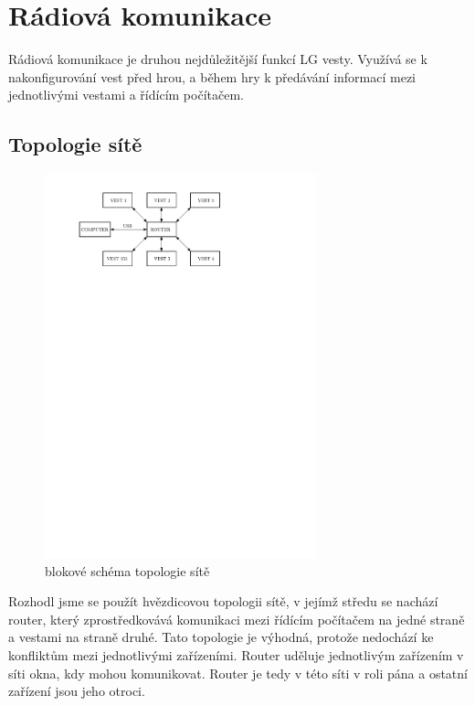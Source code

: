 \chapter{Rádiová komunikace}
Rádiová komunikace je druhou nejdůležitější funkcí LG vesty. Využívá se k nakonfigurování vest před hrou, a během hry k předávání informací mezi jednotlivými vestami a řídícím počítačem.

\section{Topologie sítě}
\begin{figure}[H]
    \begin{center}
        \includegraphics[width=0.7\textwidth]{img/rf-network}
    \end{center}
    \caption{blokové schéma topologie sítě}
\end{figure}
Rozhodl jsme se použít hvězdicovou topologii sítě, v jejímž středu se nachází router, který zprostředkovává komunikaci mezi řídícím počítačem na jedné straně a vestami na straně druhé. Tato topologie je výhodná, protože nedochází ke konfliktům mezi jednotlivými zařízeními. Router uděluje jednotlivým zařízením v síti okna, kdy mohou komunikovat. Router je tedy v této síti v roli pána a ostatní zařízení jsou jeho otroci.

